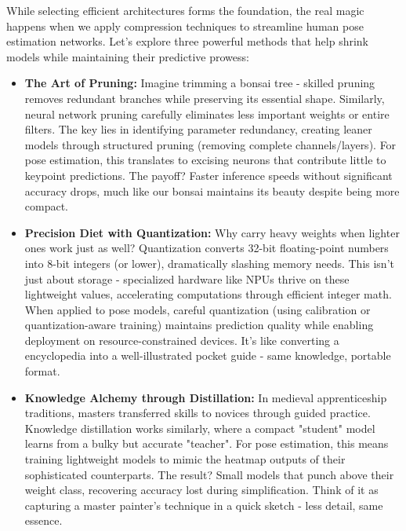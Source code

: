 While selecting efficient architectures forms the foundation, the real magic happens when we apply compression techniques to streamline human pose estimation networks. Let's explore three powerful methods that help shrink models while maintaining their predictive prowess:

\begin{itemize}
\item \textbf{The Art of Pruning:} Imagine trimming a bonsai tree - skilled pruning removes redundant branches while preserving its essential shape. Similarly, neural network pruning \citep{Han2016} carefully eliminates less important weights or entire filters. The key lies in identifying parameter redundancy, creating leaner models through structured pruning (removing complete channels/layers). For pose estimation, this translates to excising neurons that contribute little to keypoint predictions. The payoff? Faster inference speeds without significant accuracy drops, much like our bonsai maintains its beauty despite being more compact.

\item \textbf{Precision Diet with Quantization:} Why carry heavy weights when lighter ones work just as well? Quantization \citep{Jacob2018} converts 32-bit floating-point numbers into 8-bit integers (or lower), dramatically slashing memory needs. This isn't just about storage - specialized hardware like NPUs thrive on these lightweight values, accelerating computations through efficient integer math. When applied to pose models, careful quantization (using calibration or quantization-aware training) maintains prediction quality while enabling deployment on resource-constrained devices. It's like converting a encyclopedia into a well-illustrated pocket guide - same knowledge, portable format.

\item \textbf{Knowledge Alchemy through Distillation:} In medieval apprenticeship traditions, masters transferred skills to novices through guided practice. Knowledge distillation \citep{Hinton2015Distill} works similarly, where a compact "student" model learns from a bulky but accurate "teacher". For pose estimation, this means training lightweight models to mimic the heatmap outputs of their sophisticated counterparts. The result? Small models that punch above their weight class, recovering accuracy lost during simplification. Think of it as capturing a master painter's technique in a quick sketch - less detail, same essence.
\end{itemize}

